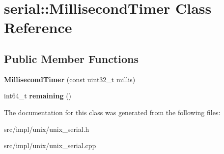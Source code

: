 \hypertarget{classserial_1_1_millisecond_timer}{}\section{serial\+:\+:Millisecond\+Timer Class Reference}
\label{classserial_1_1_millisecond_timer}
\subsection*{Public Member Functions}
\begin{DoxyCompactItemize}
\item 
{\bfseries Millisecond\+Timer} (const uint32\+\_\+t millis)\hypertarget{classserial_1_1_millisecond_timer_ac0f79f50e2859270bb1cb556377aee40}{}\label{classserial_1_1_millisecond_timer_ac0f79f50e2859270bb1cb556377aee40}

\item 
int64\+\_\+t {\bfseries remaining} ()\hypertarget{classserial_1_1_millisecond_timer_acb4d4e685a06fc7a2c24c90ac0970e35}{}\label{classserial_1_1_millisecond_timer_acb4d4e685a06fc7a2c24c90ac0970e35}

\end{DoxyCompactItemize}


The documentation for this class was generated from the following files\+:\begin{DoxyCompactItemize}
\item 
src/impl/unix/unix\+\_\+serial.\+h\item 
src/impl/unix/unix\+\_\+serial.\+cpp\end{DoxyCompactItemize}

